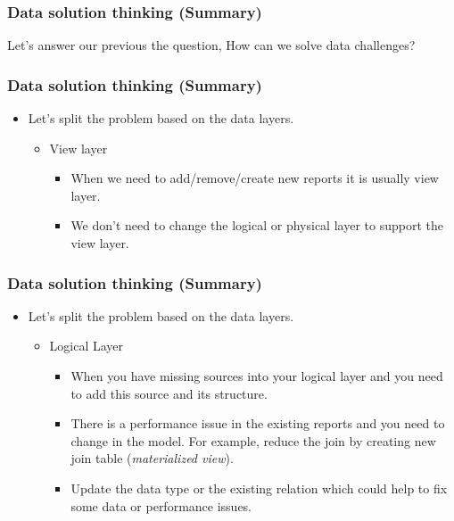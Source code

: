\begin{frame}[c]
	\frametitle{Data solution thinking (Summary) }
        \begin{center}
                  Let's answer our previous the question, How can we solve data challenges?
          \end{center}

        \end{frame}


\begin{frame}
	\frametitle{Data solution thinking (Summary) }
	\begin{itemize}[<+->]
        \item Let's split the problem based on the data layers.
          \begin{itemize}[<+->]
          \item View layer
            \begin{itemize}[<+->]
            \item When we need to add/remove/create new reports it is usually view layer.
            \item We don't need to change the logical or physical layer to support the view layer.
          \end{itemize}
        \end{itemize}
       \end{itemize}
 \end{frame}

\begin{frame}
\frametitle{Data solution thinking (Summary) }
	\begin{itemize}[<+->]
        \item Let's split the problem based on the data layers.
          \begin{itemize}[<+->]
           \item Logical Layer
           \begin{itemize}[<+->]
             \item When you have missing sources into your logical layer and you need to add this source and its structure.
             \item There is a performance issue in the existing reports and you need to change in the model. For example, reduce the join by creating new join table (\textit{materialized view}).
             \item Update the data type or the existing relation which could help to fix some data or performance issues.
            \end{itemize}
           \end{itemize}
        \end{itemize}
 \end{frame}

